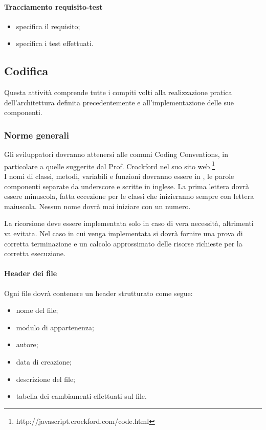 \paragraph{Tracciamento requisito-test}
\begin{itemize}
\item {}specifica il requisito;
\item {}specifica i test effettuati.
\end{itemize}


\subsection{Codifica}
Questa attività comprende tutte i compiti volti alla realizzazione pratica dell'architettura definita precedentemente e all'implementazione delle sue componenti.

\subsubsection{Norme generali}
\label{}
Gli sviluppatori dovranno attenersi alle comuni Coding Conventions, in particolare a quelle suggerite dal Prof. Crockford nel suo sito web.\footnote{http://javascript.crockford.com/code.html}\\
I nomi di classi, metodi, variabili e funzioni dovranno essere in , le parole componenti separate da underscore e scritte in inglese.
La prima lettera dovrà essere minuscola, fatta eccezione per le classi che inizieranno sempre con lettera maiuscola.
Nessun nome dovrà mai iniziare con un numero.

La ricorsione deve essere implementata solo in caso di vera necessità, altrimenti va evitata. Nel caso in cui venga implementata si dovrà fornire una prova di corretta terminazione e un calcolo approssimato delle risorse richieste per la corretta esecuzione.\\


\paragraph{Header dei file}

Ogni file dovrà contenere un header strutturato come segue:
\begin{itemize}
\item {} nome del file;
\item {} modulo di appartenenza;
\item {} autore;
\item {} data di creazione;
\item {} descrizione del file;
\item {} tabella dei cambiamenti effettuati sul file.
\end{itemize}

